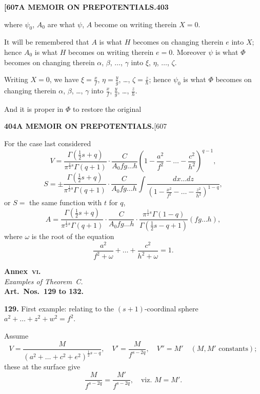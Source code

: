 \documentclass[11pt,a4paper]{article}
\begin{document}
{\newpage
\noindent\textbf{[607}\hspace{\fill}\textbf{A MEMOIR ON PREPOTENTIALS.}\hspace{\fill}\textbf{403}

where $\psi_0$, $A_0$ are what $\psi$, $A$ become on writing therein $X = 0$.

It will be remembered that $A$ is what $H$ becomes on changing therein $e$ into $X$; hence $A_0$ is what $H$ becomes on writing therein $e = 0$. Moreover $\psi$ is what $\Phi$ becomes on changing therein $\alpha$, $\beta$, $\ldots$, $\gamma$ into $\xi$, $\eta$, $\ldots$, $\zeta$.

Writing $X = 0$, we have $\xi = \frac{x}{f}$, $\eta = \frac{y}{g}$, \ldots, $\zeta = \frac{z}{h}$; hence $\psi_0$ is what $\Phi$ becomes on changing therein $\alpha$, $\beta$, \ldots, $\gamma$ into $\frac{x}{f}$, $\frac{y}{g}$, \ldots, $\frac{z}{h}$.

And it is proper in $\Phi$ to restore the original

\newpage
\noindent\textbf{404}\hspace{\fill}\textbf{A MEMOIR ON PREPOTENTIALS.}\hspace{\fill}[607

For the case last considered
\[
V = \frac{\Gamma(\frac{1}{2}s+q)}{\pi^{\frac{1}{2}s}\Gamma(q+1)} \cdot \frac{C}{A_0 fg\ldots h} \left(1 - \frac{a^2}{f^2} - \ldots - \frac{c^2}{h^2}\right)^{q-1},
\]
\[
S = \pm \frac{\Gamma(\frac{1}{2}s+q)}{\pi^{\frac{1}{2}s}\Gamma(q+1)} \cdot \frac{C}{A_0 fg\ldots h} \int \frac{dx\ldots dz}{(1-\frac{x^2}{f^2}-\ldots-\frac{z^2}{h^2})^{1-q}},
\]
or $S = $ the same function with $t$ for $q$,
\[
A = \frac{\Gamma(\frac{1}{2}s+q)}{\pi^{\frac{1}{2}s}\Gamma(q+1)} \cdot \frac{C}{A_0 fg\ldots h} \cdot \frac{\pi^{\frac{1}{2}s}\Gamma(1-q)}{\Gamma(\frac{1}{2}s-q+1)} (fg\ldots h),
\]
where $\omega$ is the root of the equation
\[
\frac{a^2}{f^2+\omega} + \ldots + \frac{c^2}{h^2+\omega} = 1.
\]

\bigskip
\noindent\textbf{Annex~\textsc{vi.}}\\
\textit{Examples of Theorem~C.}\\
\textbf{Art.~Nos.~129 to 132.}

\medskip
\noindent\textbf{129.}
First example: relating to the $(s+1)$-coordinal sphere $a^2 + \ldots + z^2 + w^2 = f^2$.

Assume
\[
V = \frac{M}{(a^2 + \ldots + c^2 + e^2)^{\frac{1}{2}s-q}},\quad V' = \frac{M}{f^{s-2q}},\quad V'' = M' \quad (M, M' \text{ constants});
\]
these at the surface give
\[
\frac{M}{f^{s-2q}} = \frac{M'}{f^{s-2q}},\quad \text{viz. } M = M'.
\]

}
\end{document}
